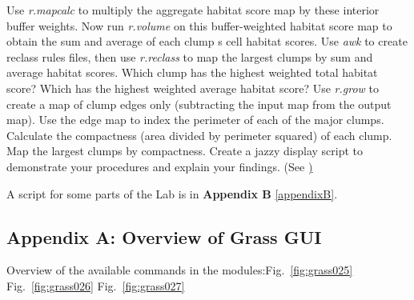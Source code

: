 Use \textit{r.mapcalc} to multiply the aggregate habitat score map by these interior buffer weights.
Now run \textit{r.volume }on this buffer-weighted habitat score map to obtain the sum and average of each clump s cell habitat scores.
Use \textit{awk} to create reclass rules files, then use \textit{r.reclass} to map the largest clumps by sum and average habitat scores.
Which clump has the highest weighted total habitat score? Which has the highest weighted average habitat score?
Use \textit{r.grow} to create a map of clump edges only (subtracting the input map from the output map).
Use the edge map to index the perimeter of each of the major clumps. 
Calculate the compactness (area divided by perimeter squared) of each clump. 
Map the largest clumps by compactness. Create a jazzy display script to demonstrate your procedures and explain your findings.
(See \href{http://www.udel.edu/johnmack/frec682/script_ideas.html})

A script for some parts of the Lab is in \textbf{Appendix B} \ref{appendixB}.

\newpage

\subsection{Appendix A: Overview of Grass GUI}
\label{appendixA}

Overview of the available commands in the modules:Fig.~\ref{fig:grass025} Fig.~\ref{fig:grass026} Fig.~\ref{fig:grass027}

